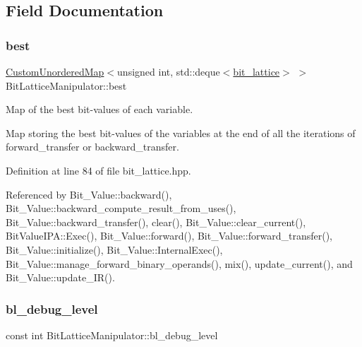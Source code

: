 \subsection{Field Documentation}
\mbox{\label{classBitLatticeManipulator_a5f5c52d2777f40ca8c3c96f28eb5f53f}} 
\subsubsection{\texorpdfstring{best}{best}}
{\footnotesize\ttfamily \hyperlink{custom__map_8hpp_ad1ed68f2ff093683ab1a33522b144adc}{Custom\+Unordered\+Map}$<$unsigned int, std\+::deque$<$\hyperlink{bit__lattice_8hpp_ab732360111c810c4eaeb4c8b81d160d6}{bit\+\_\+lattice}$>$ $>$ Bit\+Lattice\+Manipulator\+::best\hspace{0.3cm}{\ttfamily [protected]}}



Map of the best bit-\/values of each variable. 

Map storing the best bit-\/values of the variables at the end of all the iterations of forward\+\_\+transfer or backward\+\_\+transfer. 

Definition at line 84 of file bit\+\_\+lattice.\+hpp.



Referenced by Bit\+\_\+\+Value\+::backward(), Bit\+\_\+\+Value\+::backward\+\_\+compute\+\_\+result\+\_\+from\+\_\+uses(), Bit\+\_\+\+Value\+::backward\+\_\+transfer(), clear(), Bit\+\_\+\+Value\+::clear\+\_\+current(), Bit\+Value\+I\+P\+A\+::\+Exec(), Bit\+\_\+\+Value\+::forward(), Bit\+\_\+\+Value\+::forward\+\_\+transfer(), Bit\+\_\+\+Value\+::initialize(), Bit\+\_\+\+Value\+::\+Internal\+Exec(), Bit\+\_\+\+Value\+::manage\+\_\+forward\+\_\+binary\+\_\+operands(), mix(), update\+\_\+current(), and Bit\+\_\+\+Value\+::update\+\_\+\+I\+R().

\mbox{\label{classBitLatticeManipulator_ae8ecb9f512de73fdf87db86656443333}} 
\subsubsection{\texorpdfstring{bl\+\_\+debug\+\_\+level}{bl\_debug\_level}}
{\footnotesize\ttfamily const int Bit\+Lattice\+Manipulator\+::bl\+\_\+debug\+\_\+level\hspace{0.3cm}{\ttfamily [protected]}}



